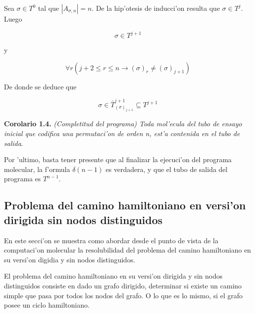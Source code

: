 \documentclass[12pt]{article}
\begin{document}
Sea $\sigma \in T^{0}$ tal que $|A_{\sigma,n}| = n$. De la hip'otesis de inducci'on resulta que $\sigma \in T^{j}$. Luego

\begin{equation*}
  \sigma \in T^{j+1}
\end{equation*}

y

\begin{equation*}
  \forall r (j + 2 \leq r \leq n \longrightarrow (\sigma)_{r} \neq (\sigma)_{j+1})
\end{equation*}

De donde se deduce que

\begin{equation*}
  \sigma \in \bar{T}_{(\sigma)_{j+1}}^{j+1} \subseteq T^{j+1}
\end{equation*}

\textbf{Corolario 1.4.} \textit{(Completitud del programa) Toda mol'ecula del tubo de ensayo inicial que codifica una
permutaci'on de orden n, est'a contenida en el tubo de salida}.

Por 'ultimo, basta tener presente que al finalizar la ejecuci'on del programa molecular, la f'ormula $\delta(n - 1)$ es
verdadera, y que el tubo de salida del programa es $T^{n-1}$.

\subsection{Problema del camino hamiltoniano en versi'on dirigida sin nodos distinguidos}

En este secci'on se muestra como abordar desde el punto de vista de la computaci'on molecular la resolubilidad
del problema del camino hamiltoniano en su versi'on digidia y sin nodos distinguidos.

El problema del camino hamiltoniano en su versi'on dirigida y sin nodos distinguidos consiste en
dado un grafo dirigido, determinar si existe un camino simple que pasa por todos los nodos del grafo. O lo
que es lo mismo, si el grafo posee un ciclo hamiltoniano.
\end{document}
